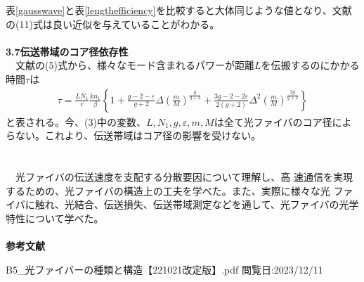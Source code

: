 \documentclass[a4paper,10.5pt]{ltjsarticle}
\begin{document}
表\ref{gausswave}と表\ref{lengthefficiency}を比較すると大体同じような値となり、文献\cite{text}の(11)式は良い近似を与えていることがわかる。\\
\\
{\large \bfseries 3.7伝送帯域のコア径依存性}\\
　文献\cite{text}の(5)式から、様々なモード含まれるパワーが距離$L$を伝搬するのにかかる時間$\tau$は
\begin{align}
  \tau=\frac{LN_1}{c}\frac{kn_1}{\beta}\left\{1+\frac{g-2-\varepsilon}{g+2}\Delta\left(\frac{m}{M}\right)^\frac{g}{g+2}+\frac{3g-2-2\varepsilon}{2(g+2)}\Delta^2\left(\frac{m}{M}\right)^\frac{2g}{g+2}\right\}
\end{align}
と表される。今、(3)中の変数、$L,N_1,g,\varepsilon,m,M$は全て光ファイバのコア径によらない。これより、伝送帯域はコア径の影響を受けない。\\
\\
\hspace{-2pt}{\Large \bfseries 4.結論}\\
　光ファイバの伝送速度を支配する分散要因について理解し、高
速通信を実現するための、光ファイバの構造上の工夫を学べた。また、実際に様々な光
ファイバに触れ、光結合、伝送損失、伝送帯域測定などを通して、光ファイバの光学
特性について学べた。\\
\\
{\Large \bfseries 参考文献}
\begin{thebibliography}{1}
\vspace{-1.5cm}
   B5\_光ファイバーの種類と構造【221021改定版】.pdf 閲覧日:2023/12/11
\end{thebibliography}
\end{document}
